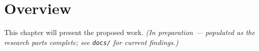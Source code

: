 \section{Overview}
This chapter will present the proposed work. \emph{(In preparation --- populated as the research parts complete; see \texttt{docs/} for current findings.)}
